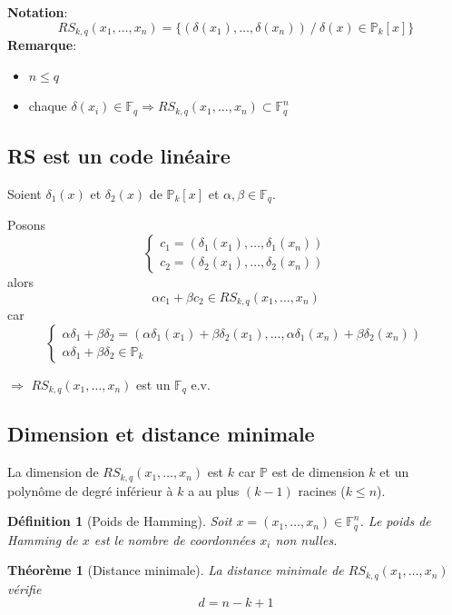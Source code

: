 \documentclass[a4paper,10pt,twocolumn]{article}
\theoremstyle{break}
\newcommand{\F}{\mathbb{F}}
\newcommand{\Poly}{\mathbb{P}}
\newtheorem{mydef}{Définition}
\newtheorem{myth}{Théorème}
\newenvironment{note}[1]
{\textbf{#1}:}
{}
\newenvironment{remarque}
{\begin{note}{Remarque}}
{\end{note}}
\begin{document}
\begin{note}{Notation}
 $$RS_{k,q}(x_1, \ldots, x_n) = \{ (\delta(x_1), \ldots, \delta(x_n)) \ /\  \delta(x) \in \Poly_k[x] \}$$
\end{note}
\begin{remarque}
 \begin{itemize}
  \item $n \le q$
  \item chaque $\delta(x_i) \in \F_q \Rightarrow RS_{k,q}(x_1, \ldots, x_n) \subset \F_q^n$
 \end{itemize}
\end{remarque}

\subsection{RS est un code linéaire}
Soient $\delta_1(x)$ et $\delta_2(x)$ de $\Poly_k[x]$ et $\alpha, \beta \in \F_q$.

Posons
$$ \left \{ \begin{array}{l}
c_1 = (\delta_1(x_1), \ldots, \delta_1(x_n)) \\
c_2 = (\delta_2(x_1), \ldots, \delta_2(x_n))
\end{array} \right. $$
alors $$\alpha c_1 + \beta c_2 \in RS_{k,q}(x_1, \ldots, x_n)$$ car 
$$ \left \{ \begin{array}{l}
\alpha\delta_1 + \beta\delta_2 = (\alpha\delta_1(x_1) + \beta\delta_2(x_1), \ldots, \alpha\delta_1(x_n) + \beta\delta_2(x_n)) \\
\alpha\delta_1 + \beta\delta_2 \in \Poly_k
\end{array} \right. $$

$\Rightarrow$ $RS_{k,q}(x_1, \ldots, x_n)$ est un $\F_q$ e.v.

\subsection{Dimension et distance minimale}
La dimension de $RS_{k,q}(x_1, \ldots, x_n)$ est $k$ car $\Poly$ est de dimension $k$ 
et un polynôme de degré inférieur à $k$ a au plus $(k-1)$ racines ($k \le n$).

\begin{mydef}[Poids de Hamming]
 Soit $x = (x_1, \ldots, x_n) \in \F_q^n$. Le poids de Hamming de $x$ est le nombre de coordonnées $x_i$ non nulles.
\end{mydef}

\begin{myth}[Distance minimale]
 La distance minimale de $RS_{k,q}(x_1, \ldots, x_n)$ vérifie
 $$ d = n-k+1 $$
\end{myth}
\end{document}
